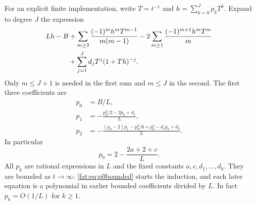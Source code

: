 \documentclass[11pt,letterpaper]{article}
\numberwithin{equation}{section}
\theoremstyle{remark}\newtheorem{remark}[theorem]{Remark}
\begin{document}
For an explicit finite implementation, write $T=t^{-1}$ and $h=\sum_{k=0}^Jp_kT^k$. Expand to degree $J$ the expression
\begin{align}\label{fat:eq:inverse-engine}
 Lh-B
 &+\sum_{m\ge2}\frac{(-1)^m h^mT^{m-1}}{m(m-1)}
 -2\sum_{m\ge1}\frac{(-1)^{m+1}h^mT^m}{m}\notag\\
 &+\sum_{j=1}^{J}d_jT^j(1+Th)^{-j}.
\end{align}
Only $m\le J+1$ is needed in the first sum and $m\le J$ in the second. The first three coefficients are
\begin{align}
 p_0&=B/L,\label{fat:eq:p0}\\
 p_1&=-\frac{p_0^2/2-2p_0+d_1}{L},\label{fat:eq:p1}\\
 p_2&=-\frac{(p_0-2)p_1-p_0^3/6+p_0^2-d_1p_0+d_2}{L}.\label{fat:eq:p2}
\end{align}
In particular
\begin{equation}\label{fat:eq:p0bounded}
 p_0=2-\frac{2a+2+c}{L}.
\end{equation}
All $p_k$ are rational expressions in $L$ and the fixed constants $a,c,d_1,\ldots,d_k$. They are bounded as $t\to\infty$: \eqref{fat:eq:p0bounded} starts the induction, and each later equation is a polynomial in earlier bounded coefficients divided by $L$. In fact $p_k=O(1/L)$ for $k\ge1$.
\end{document}
